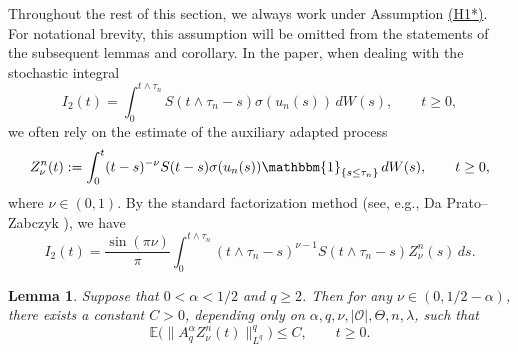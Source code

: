 \documentclass[10pt]{article}
\numberwithin{figure}{section}
\numberwithin{equation}{section}
\newtheorem{lemma}[theorem]{Lemma}
\newcommand{\0}{{\theta}}
\def\be{\begin{equation}}
\def\ee{\end{equation}}
\def\Vs{\vskip8pt}\def\vs{\vskip4pt}
\begin{document}
Throughout the rest of this section, we always work under Assumption \hyperref[H1*]{(H1*)}. For notational brevity, this assumption will be omitted from the statements of the subsequent lemmas and corollary.
\Vs
In the paper, when dealing with the stochastic integral
$$
I_2(t)=\int_0^{t\wedge\tau_n}S(t\wedge\tau_n-s)\sigma(u_n(s))\,dW(s),\qquad t\ge0,
$$
we often rely on the estimate of the auxiliary adapted process
$$
Z_\nu^n(t):=\int_0^t(t-s)^{-\nu}S(t-s)\sigma(u_n(s))\mathbbm{1}_{\{s\le\tau_n\}}\,dW(s),\qquad t\ge0,
$$
where $\nu\in(0,1)$.
By the standard factorization method (see, e.g., Da Prato--Zabczyk \cite[Sec. 5.3]{DZ}), we have
\be\label{eq3.10}
I_2(t)=\frac{\sin(\pi\nu)}{\pi}\int_0^{t\wedge\tau_n}(t\wedge\tau_n-s)^{\nu-1}S(t\wedge\tau_n-s)Z_\nu^n(s)\,ds.
\ee

\begin{lemma}\label{lem:Znu-estimate}
Suppose that $0<\alpha<1/2$ and $q\ge2$. Then for any $\nu\in(0,1/2-\alpha)$, there exists a constant $C>0$, depending only on $\alpha,q,\nu,|\mathcal O|,\Theta,n,\lambda$, such that
$$
\mathbb{E}\big(\|A_q^\alpha Z_\nu^n(t)\|_{L^q}^q\big) \le C,\qquad t\ge0.
$$
\end{lemma}
\end{document}

